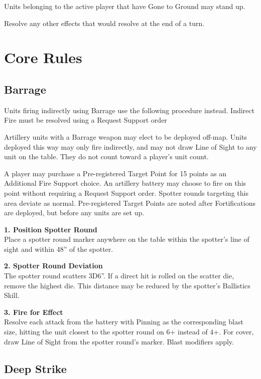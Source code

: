 \documentclass[letterpaper,twocolumn,oneside,titlepage]{book}
\begin{document}
Units belonging to the active player that have Gone to Ground may stand
up.

Resolve any other effects that would resolve at the end of a turn.

\chapter{\texorpdfstring{\textbf{Core
Rules}}{Core Rules}}\label{core-rules}

\section{\texorpdfstring{\textbf{Barrage}}{Barrage}}\label{barrage}

Units firing indirectly using Barrage use the following procedure
instead. Indirect Fire must be resolved using a Request Support order

Artillery units with a Barrage weapon may elect to be deployed off-map.
Units deployed this way may only fire indirectly, and may not draw Line
of Sight to any unit on the table. They do not count toward a player's
unit count.

A player may purchase a Pre-registered Target Point for 15 points as an
Additional Fire Support choice. An artillery battery may choose to fire
on this point without requiring a Request Support order. Spotter rounds
targeting this area deviate as normal. Pre-registered Target Points are
noted after Fortifications are deployed, but before any units are set
up.

\textbf{1. Position Spotter Round}\\
Place a spotter round marker anywhere on the table within the spotter's
line of sight and within 48'' of the spotter.

\textbf{2. Spotter Round Deviation}\\
The spotter round scatters 3D6''. If a direct hit is rolled on the
scatter die, remove the highest die. This distance may be reduced by the
spotter's Ballistics Skill.

\textbf{3. Fire for Effect}\\
Resolve each attack from the battery with Pinning as the corresponding
blast size, hitting the unit closest to the spotter round on 6+ instead
of 4+. For cover, draw Line of Sight from the spotter round's marker.
Blast modifiers apply.

\section{\texorpdfstring{\textbf{Deep
Strike}}{Deep Strike}}\label{deep-strike}
\end{document}
